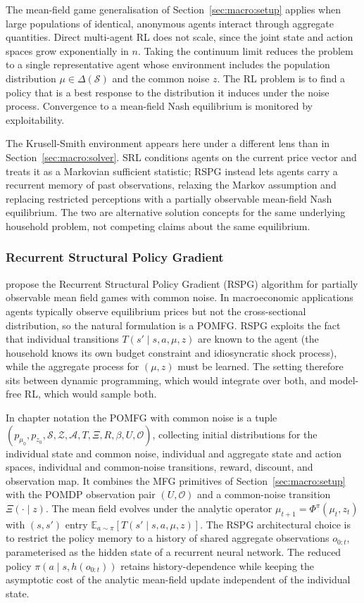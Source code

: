 The mean-field game generalisation of Section~\ref{sec:macro:setup}
applies when large populations of identical, anonymous agents
interact through aggregate quantities. Direct multi-agent RL does
not scale, since the joint state and action spaces grow exponentially
in $n$. Taking the continuum limit reduces the problem to a single
representative agent whose environment includes the population
distribution $\mu \in \Delta(\mathcal S)$ and the common noise $z$.
The RL problem is to find a policy that is a best response to the
distribution it induces under the noise process. Convergence to a
mean-field Nash equilibrium is monitored by exploitability.

The Krusell-Smith environment appears here under a different lens
than in Section~\ref{sec:macro:solver}. SRL conditions agents on the
current price vector and treats it as a Markovian sufficient
statistic; RSPG instead lets agents carry a recurrent memory of past
observations, relaxing the Markov assumption and replacing restricted
perceptions with a partially observable mean-field Nash equilibrium.
The two are alternative solution concepts for the same underlying
household problem, not competing claims about the same equilibrium.

\subsubsection{Recurrent Structural Policy Gradient}
\label{sec:macro:rspg}

\citet{Wibault2026rspg} propose the Recurrent Structural Policy
Gradient (RSPG) algorithm for partially observable mean field games
with common noise. In macroeconomic applications agents typically
observe equilibrium prices but not the cross-sectional distribution,
so the natural formulation is a POMFG. RSPG exploits the fact that
individual transitions $T(s' \mid s, a, \mu, z)$ are known to the
agent (the household knows its own budget constraint and
idiosyncratic shock process), while the aggregate process for
$(\mu, z)$ must be learned. The setting therefore sits between
dynamic programming, which would integrate over both, and model-free
RL, which would sample both.

In chapter notation the POMFG with common noise is a tuple
$(p_{\mu_0}, p_{z_0}, \mathcal S, \mathcal Z, \mathcal A, T, \Xi, R,
\beta, U, \mathcal O)$, collecting initial distributions for the
individual state and common noise, individual and aggregate state
and action spaces, individual and common-noise transitions, reward,
discount, and observation map. It combines the MFG primitives of
Section~\ref{sec:macro:setup} with the POMDP observation pair
$(U, \mathcal O)$ and a common-noise transition $\Xi(\cdot \mid z)$.
The mean field evolves under the analytic operator
$\mu_{t+1} = \Phi^\pi(\mu_t, z_t)$ with $(s, s')$ entry
$\mathbb{E}_{a \sim \pi}[T(s' \mid s, a, \mu, z)]$. The RSPG
architectural choice is to restrict the policy memory to a history
of shared aggregate observations $o_{0:t}$, parameterised as the
hidden state of a recurrent neural network. The reduced policy
$\pi(a \mid s, h(o_{0:t}))$ retains history-dependence while keeping
the asymptotic cost of the analytic mean-field update independent of
the individual state.

